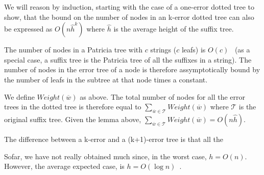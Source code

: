 We will reason by induction, starting with the case of a one-error dotted tree to show, that the bound on the number of nodes in an k-error dotted tree can also be expressed as $O(n\hat{h}^k)$ where $\hat{h}$ is the average height of the suffix tree.

The number of nodes in a Patricia tree with $c$ strings ($c$ leafs) is $O(c)$~\cite{patricia} (as a special case, a suffix tree is the Patricia tree of all the suffixes in a string). The number of nodes in the error tree of a node is therefore assymptotically bound by the number of leafs in the subtree at that node times a constant.

We define $\mathit{Weight}(\overline{w})$ as above. The total number of nodes for all the error trees in the dotted tree is therefore equal to $\sum_{\overline{w} \in \mathcal{T}}\mathit{Weight}(\overline{w})$ where $\mathcal{T}$ is the original suffix tree. Given the lemma above, $\sum_{\overline{w} \in \mathcal{T}}\mathit{Weight}(\overline{w}) = O(n\hat{h})$.

The difference between a k-error and a (k+1)-error tree is that all the 

Sofar, we have not really obtained much since, in the worst case, $h=O(n)$. However, the average expected case, is $h=O(\log n)$~\cite{devroye:note,szpankowski:unexpected}.

